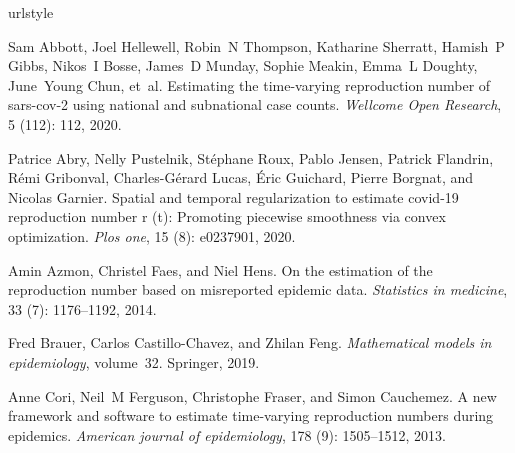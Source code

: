 \documentclass[10pt,letterpaper]{article}
\begin{document}
%
%
% 
\begin{thebibliography}{23}
  \providecommand{\natexlab}[1]{#1}
  \providecommand{\url}[1]{\texttt{#1}}
  \expandafter\ifx\csname urlstyle\endcsname\relax
    \providecommand{\doi}[1]{doi: #1}\else
    \providecommand{\doi}{doi: \begingroup \urlstyle{rm}\Url}\fi
  
  Sam Abbott, Joel Hellewell, Robin~N Thompson, Katharine Sherratt, Hamish~P
    Gibbs, Nikos~I Bosse, James~D Munday, Sophie Meakin, Emma~L Doughty,
    June~Young Chun, et~al.
  \newblock Estimating the time-varying reproduction number of sars-cov-2 using
    national and subnational case counts.
  \newblock \emph{Wellcome Open Research}, 5 (112): 112, 2020.
  
  Patrice Abry, Nelly Pustelnik, St{\'e}phane Roux, Pablo Jensen, Patrick
    Flandrin, R{\'e}mi Gribonval, Charles-G{\'e}rard Lucas, {\'E}ric Guichard,
    Pierre Borgnat, and Nicolas Garnier.
  \newblock Spatial and temporal regularization to estimate covid-19 reproduction
    number r (t): Promoting piecewise smoothness via convex optimization.
  \newblock \emph{Plos one}, 15 (8): e0237901, 2020.
  
  Amin Azmon, Christel Faes, and Niel Hens.
  \newblock On the estimation of the reproduction number based on misreported
    epidemic data.
  \newblock \emph{Statistics in medicine}, 33 (7): 1176--1192,
    2014.
  
  Fred Brauer, Carlos Castillo-Chavez, and Zhilan Feng.
  \newblock \emph{Mathematical models in epidemiology}, volume~32.
  \newblock Springer, 2019.
  
  Anne Cori, Neil~M Ferguson, Christophe Fraser, and Simon Cauchemez.
  \newblock A new framework and software to estimate time-varying reproduction
    numbers during epidemics.
  \newblock \emph{American journal of epidemiology}, 178 (9):
    1505--1512, 2013.
  

\end{thebibliography}
\end{document}
